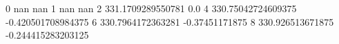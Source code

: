 0 nan nan
1 nan nan
2 331.1709289550781 0.0
4 330.75042724609375 -0.420501708984375
6 330.7964172363281 -0.37451171875
8 330.926513671875 -0.244415283203125
